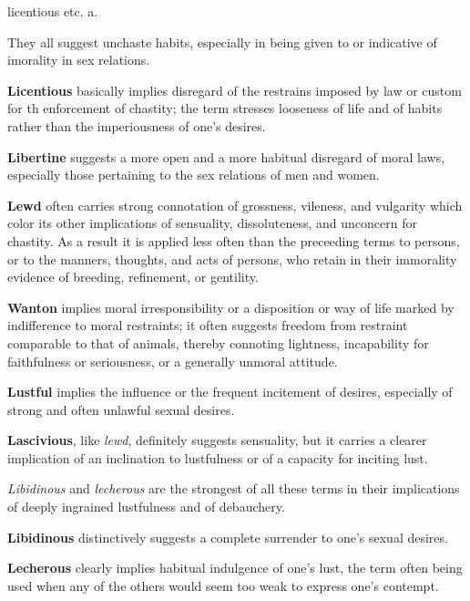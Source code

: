 \begin{description}[style=unboxed]
{licentious etc.} a.
\begin{mynewitemize}
\item They all suggest unchaste habits, especially in being given to or indicative
of imorality in sex relations.
\item \textbf{Licentious} basically implies disregard of the restrains imposed
by law or custom for th enforcement of chastity; the term stresses looseness of 
life and of habits rather than the imperiousness of one's desires.
\item \textbf{Libertine} suggests a more open and a more habitual disregard of 
moral laws, especially those pertaining to the sex relations of men and women.
\item \textbf{Lewd} often carries strong connotation of grossness, vileness, and
vulgarity which color its other implications of sensuality, dissoluteness, and
unconcern for chastity. As a result it is applied less often than the preceeding
terms to persons, or to the manners, thoughts, and acts of persons, who retain
in their immorality evidence of breeding, refinement, or gentility.
\item \textbf{Wanton} implies moral irresponsibility or a disposition or way
of life marked by indifference to moral restraints; it often suggests freedom
from restraint comparable to that of animals, thereby connoting lightness,
incapability for faithfulness or seriousness, or a generally unmoral attitude.
\item \textbf{Lustful} implies the influence or the frequent incitement of
desires, especially of strong and often unlawful sexual desires.
\item \textbf{Lascivious}, like \textit{lewd}, definitely suggests sensuality,
but it carries a clearer implication of an inclination to lustfulness or of a
capacity for inciting lust.
\item \textit{Libidinous} and \textit{lecherous} are the strongest of all 
these terms in their implications of deeply ingrained lustfulness and of
debauchery.
\item \textbf{Libidinous} distinctively suggests a complete surrender to one's
sexual desires.
\item \textbf{Lecherous} clearly implies habitual indulgence of one's lust,
the term often being used when any of the others would seem too weak to 
express one's contempt.
\end{mynewitemize}


\end{description}
